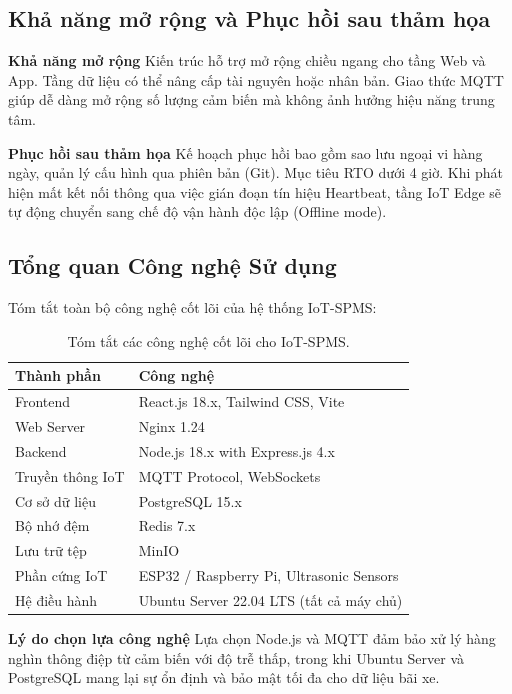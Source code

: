 \subsection{Khả năng mở rộng và Phục hồi sau thảm họa}
\noindent \textbf{Khả năng mở rộng} Kiến trúc hỗ trợ mở rộng chiều ngang cho tầng Web và App. Tầng dữ liệu có thể nâng cấp tài nguyên hoặc nhân bản. Giao thức MQTT giúp dễ dàng mở rộng số lượng cảm biến mà không ảnh hưởng hiệu năng trung tâm.

\medskip
\noindent \textbf{Phục hồi sau thảm họa} Kế hoạch phục hồi bao gồm sao lưu ngoại vi hàng ngày, quản lý cấu hình qua phiên bản (Git). Mục tiêu RTO dưới 4 giờ. Khi phát hiện mất kết nối thông qua việc gián đoạn tín hiệu Heartbeat, tầng IoT Edge sẽ tự động chuyển sang chế độ vận hành độc lập (Offline mode).

\subsection{Tổng quan Công nghệ Sử dụng} 
Tóm tắt toàn bộ công nghệ cốt lõi của hệ thống IoT-SPMS:
\begin{table}[H]
    \centering
    \caption{Tóm tắt các công nghệ cốt lõi cho IoT-SPMS.}
    \label{tab:tech-stack}
    \begin{tabular}{|l|l|}
        \hline
        \textbf{Thành phần} & \textbf{Công nghệ} \\ \hline
        Frontend & React.js 18.x, Tailwind CSS, Vite \\ \hline
        Web Server & Nginx 1.24 \\ \hline
        Backend & Node.js 18.x with Express.js 4.x \\ \hline
        Truyền thông IoT & MQTT Protocol, WebSockets \\ \hline
        Cơ sở dữ liệu & PostgreSQL 15.x \\ \hline
        Bộ nhớ đệm & Redis 7.x \\ \hline
        Lưu trữ tệp & MinIO \\ \hline
        Phần cứng IoT & ESP32 / Raspberry Pi, Ultrasonic Sensors \\ \hline
        Hệ điều hành & Ubuntu Server 22.04 LTS (tất cả máy chủ) \\ \hline
    \end{tabular}
\end{table}

\noindent \textbf{Lý do chọn lựa công nghệ} Lựa chọn Node.js và MQTT đảm bảo xử lý hàng nghìn thông điệp từ cảm biến với độ trễ thấp, trong khi Ubuntu Server và PostgreSQL mang lại sự ổn định và bảo mật tối đa cho dữ liệu bãi xe.